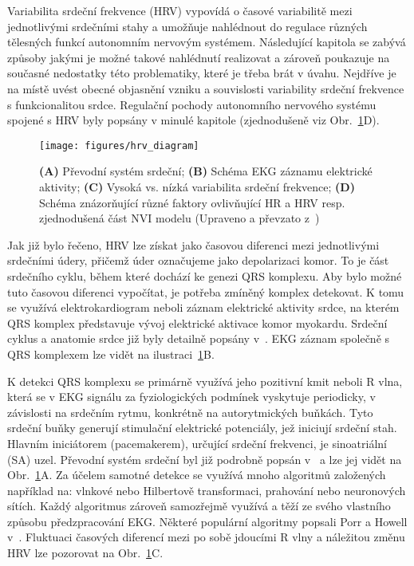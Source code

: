 Variabilita srdeční frekvence (\gls{HRV}) vypovídá o časové variabilitě mezi
jednotlivými srdečními stahy a umožňuje nahlédnout do regulace různých tělesných
funkcí autonomním nervovým systémem. Následující kapitola se zabývá způsoby
jakými je možné takové nahlédnutí realizovat a zároveň poukazuje na současné
nedostatky této problematiky, které je třeba brát v úvahu. Nejdříve je na místě
uvést obecné objasnění vzniku a souvislosti variability srdeční frekvence s
funkcionalitou srdce. Regulační pochody autonomního nervového systému spojené s
\gls{HRV} byly popsány v minulé kapitole (zjednodušeně viz
Obr.~\ref{fig:hrv_diagram}D).

\begin{figure}[!htb]
    \begin{center}
        \texttt{[image: figures/hrv\_diagram]}
        \caption{\textbf{(A)} Převodní systém srdeční; \textbf{(B)} Schéma
            \gls{EKG} záznamu elektrické aktivity; \textbf{(C)} Vysoká vs. nízká
            variabilita srdeční frekvence; \textbf{(D)} Schéma znázorňující
            různé faktory ovlivňující \gls{HR} a \gls{HRV} resp. zjednodušená
            část \gls{NVI} modelu (Upraveno a převzato z~\cite{Lujan2021})}
        \label{fig:hrv_diagram}
    \end{center}
\end{figure}

Jak již bylo řečeno, \gls{HRV} lze získat jako časovou diferenci mezi jednotlivými
srdečními údery, přičemž úder označujeme jako depolarizaci komor. To je část
srdečního cyklu, během které dochází ke genezi QRS komplexu. Aby bylo možné tuto
časovou diferenci vypočítat, je potřeba zmíněný komplex detekovat. K tomu se
využívá elektrokardiogram neboli záznam elektrické aktivity srdce, na kterém QRS
komplex představuje vývoj elektrické aktivace komor myokardu. Srdeční cyklus a
anatomie srdce již byly detailně popsány v~\cite{Stejfa2006,Weinhaus2005,Cihak2016}.
EKG záznam společně s QRS komplexem lze vidět na ilustraci~\ref{fig:hrv_diagram}B.

K detekci QRS komplexu se primárně využívá jeho pozitivní kmit neboli R vlna,
která se v \gls{EKG} signálu za fyziologických podmínek vyskytuje periodicky, v
závislosti na srdečním rytmu, konkrétně na autorytmických buňkách. Tyto srdeční
buňky generují stimulační elektrické potenciály, jež iniciují srdeční stah.
Hlavním iniciátorem (pacemakerem), určující srdeční frekvenci, je sinoatriální
(\gls{SA}) uzel. Převodní systém srdeční byl již podrobně popsán
v~\cite{Stejfa2006,Weinhaus2005,Goldberger2017} a lze jej vidět na
Obr.~\ref{fig:hrv_diagram}A. Za účelem samotné detekce se využívá mnoho
algoritmů založených například na: vlnkové nebo Hilbertově transformaci,
prahování nebo neuronových sítích. Každý algoritmus zároveň samozřejmě využívá a
těží ze svého vlastního způsobu předzpracování EKG. Některé populární algoritmy
popsali Porr a Howell v~\cite{Porr2019}. Fluktuaci časových diferencí mezi po
sobě jdoucími R vlny a náležitou změnu HRV lze pozorovat na
Obr.~\ref{fig:hrv_diagram}C.

